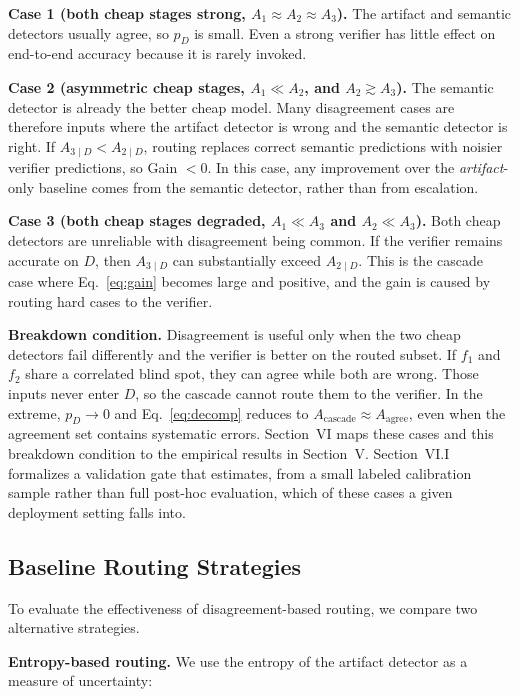 \documentclass{ieeeaccess}
\begin{document}
\textbf{Case 1 (both cheap stages strong, $A_1 \approx A_2 \approx A_3$).}
The artifact and semantic detectors usually agree, so $p_D$ is small. Even
a strong verifier has little effect on end-to-end accuracy because it is
rarely invoked.

\textbf{Case 2 (asymmetric cheap stages, $A_1 \ll A_2$, and $A_2 \gtrsim A_3$).}
The semantic detector is already the better cheap model. Many disagreement
cases are therefore inputs where the artifact detector is wrong and the
semantic detector is right. If $A_{3\mid D} < A_{2\mid D}$, routing replaces
correct semantic predictions with noisier verifier predictions, so
Gain $<0$. In this case, any improvement over the \emph{artifact}-only
baseline comes from the semantic detector, rather than from escalation.

\textbf{Case 3 (both cheap stages degraded, $A_1 \ll A_3$ and $A_2 \ll A_3$).}
Both cheap detectors are unreliable with disagreement being common. If the
verifier remains accurate on $D$, then $A_{3\mid D}$ can substantially
exceed $A_{2\mid D}$. This is the cascade case where Eq.~\eqref{eq:gain} becomes
large and positive, and the gain is caused by routing hard cases to the
verifier.

\textbf{Breakdown condition.} Disagreement is useful only when the two cheap
detectors fail differently and the verifier is better on the routed subset.
If $f_1$ and $f_2$ share a correlated blind spot, they can agree while both
are wrong. Those inputs never enter $D$, so the cascade cannot route them to
the verifier. In the extreme, $p_D \to 0$ and
Eq.~\eqref{eq:decomp} reduces to
$A_{\text{cascade}} \approx A_{\text{agree}}$, even when the agreement set
contains systematic errors. Section~VI maps these cases and this breakdown
condition to the empirical results in Section~V.
Section~VI.I formalizes a validation gate that estimates, from a small
labeled calibration sample rather than full post-hoc evaluation, which of
these cases a given deployment setting falls into.

\subsection{Baseline Routing Strategies}

To evaluate the effectiveness of disagreement-based routing, we compare two alternative strategies.

\textbf{Entropy-based routing.}  
We use the entropy of the artifact detector as a measure of uncertainty:
\end{document}
